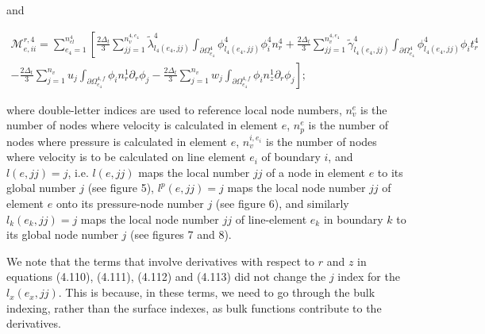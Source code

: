 \documentclass{article}
\begin{document}
and

\begin{equation}
\begin{array}{l} \mathcal{M}_{e,ii}^{r,4} = \sum_{e_4=1}^{n_{el}^{4}} \left[ \frac{2\Delta_t}{3} \sum_{jj=1}^{n_v^{4,e_4}} \tilde{\lambda}_{l_4(e_4,jj)}^4 \int_{\partial \Omega_{e_4}^{4}} \phi_{l_4(e_4,jj)}^4 \phi_i^4 n_r^4 + \frac{2\Delta_t}{3} \sum_{jj=1}^{n_v^{4,e_4}} \tilde{\gamma}_{l_4(e_4,jj)}^4 \int_{\partial \Omega_{e_4}^{4}} \phi_{l_4(e_4,jj)}^4 \phi_i t_r^4 \right. \\ \left. - \frac{2\Delta_t}{3} \sum_{j=1}^{n_v} u_j \int_{\partial \Omega_{e_4}^{4,f}} \phi_i n_r^1 \partial_r \phi_j - \frac{2\Delta_t}{3} \sum_{j=1}^{n_v} w_j \int_{\partial \Omega_{e_4}^{4,f}} \phi_i n_z^1 \partial_r \phi_j \right]; \end{array} \tag{4.113}
\end{equation}

where double-letter indices are used to reference local node numbers, \(n_v^e\) is the number of nodes where velocity is calculated in element \(e\), \(n_p^e\) is the number of nodes where pressure is calculated in element \(e\), \(n_v^{i,e_i}\) is the number of nodes where velocity is to be calculated on line element \(e_i\) of boundary \(i\), and \(l(e,jj) = j\), i.e. \(l(e,jj)\) maps the local number \(jj\) of a node in element \(e\) to its global number \(j\) (see figure 5), \(l^p(e,jj) = j\) maps the local node number \(jj\) of element \(e\) onto its pressure-node number \(j\) (see figure 6), and similarly \(l_k(e_k,jj) = j\) maps the local node number \(jj\) of line-element \(e_k\) in boundary \(k\) to its global node number \(j\) (see figures 7 and 8).

We note that the terms that involve derivatives with respect to \(r\) and \(z\) in equations (4.110), (4.111), (4.112) and (4.113) did not change the \(j\) index for the \(l_x(e_x,jj)\). This is because, in these terms, we need to go through the bulk indexing, rather than the surface indexes, as bulk functions contribute to the derivatives.
\end{document}
